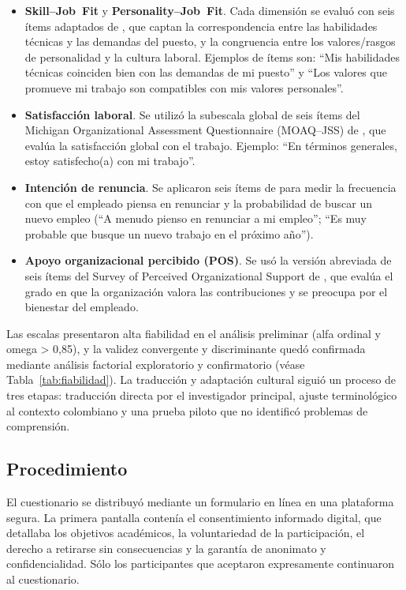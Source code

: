 \begin{itemize}
  \item \textbf{Skill--Job Fit} y \textbf{Personality--Job Fit}. Cada dimensión se evaluó con seis ítems adaptados de \cite{lauver_distinguishing_2001}, que captan la correspondencia entre las habilidades técnicas y las demandas del puesto, y la congruencia entre los valores/rasgos de personalidad y la cultura laboral. Ejemplos de ítems son: “Mis habilidades técnicas coinciden bien con las demandas de mi puesto” y “Los valores que promueve mi trabajo son compatibles con mis valores personales”.
  \item \textbf{Satisfacción laboral}. Se utilizó la subescala global de seis ítems del Michigan Organizational Assessment Questionnaire (MOAQ–JSS) de \cite{bowling_meta_2008}, que evalúa la satisfacción global con el trabajo. Ejemplo: “En términos generales, estoy satisfecho(a) con mi trabajo”.
  \item \textbf{Intención de renuncia}. Se aplicaron seis ítems de \cite{miller_evaluation_1979} para medir la frecuencia con que el empleado piensa en renunciar y la probabilidad de buscar un nuevo empleo (“A menudo pienso en renunciar a mi empleo”; “Es muy probable que busque un nuevo trabajo en el próximo año”).
  \item \textbf{Apoyo organizacional percibido (POS)}. Se usó la versión abreviada de seis ítems del Survey of Perceived Organizational Support de \cite{eisenberger_perceived_1997}, que evalúa el grado en que la organización valora las contribuciones y se preocupa por el bienestar del empleado.
\end{itemize}

Las escalas presentaron alta fiabilidad en el análisis preliminar (alfa ordinal y omega > 0,85), y la validez convergente y discriminante quedó confirmada mediante análisis factorial exploratorio y confirmatorio (véase Tabla \ref{tab:fiabilidad}). La traducción y adaptación cultural siguió un proceso de tres etapas: traducción directa por el investigador principal, ajuste terminológico al contexto colombiano y una prueba piloto que no identificó problemas de comprensión.

\subsection{Procedimiento}
El cuestionario se distribuyó mediante un formulario en línea en una plataforma segura. La primera pantalla contenía el consentimiento informado digital, que detallaba los objetivos académicos, la voluntariedad de la participación, el derecho a retirarse sin consecuencias y la garantía de anonimato y confidencialidad. Sólo los participantes que aceptaron expresamente continuaron al cuestionario.

